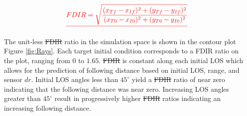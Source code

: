 \documentclass[conference]{IEEEtran}
\providecommand{\DIFadd}[1]{{\protect\color{blue}\uwave{#1}}} %
\providecommand{\DIFdel}[1]{{\protect\color{red}\sout{#1}}}                      %
\providecommand{\DIFaddbegin}{} %
\providecommand{\DIFaddend}{} %
\providecommand{\DIFdelbegin}{} %
\providecommand{\DIFdelend}{} %
\newcommand{\DIFscaledelfig}{0.5}
\newlength{\DIFdelgraphicswidth} %
\newlength{\DIFdelgraphicsheight} %
\newcommand{\DIFaddincludegraphics}[2][]{{\color{blue}\fbox{\DIFOincludegraphics[#1]{#2}}}} %
\newcommand{\DIFdelincludegraphics}[2][]{%
\sbox{\DIFdelgraphicsbox}{\DIFOincludegraphics[#1]{#2}}%
\settoboxwidth{\DIFdelgraphicswidth}{\DIFdelgraphicsbox} %
\settoboxtotalheight{\DIFdelgraphicsheight}{\DIFdelgraphicsbox} %
\scalebox{\DIFscaledelfig}{%
\parbox[b]{\DIFdelgraphicswidth}{\usebox{\DIFdelgraphicsbox}\\[-\baselineskip] \rule{\DIFdelgraphicswidth}{0em}}\llap{\resizebox{\DIFdelgraphicswidth}{\DIFdelgraphicsheight}{%
\setlength{\unitlength}{\DIFdelgraphicswidth}%
\begin{picture}(1,1)%
\thicklines\linethickness{2pt} %
{\color[rgb]{1,0,0}\put(0,0){\framebox(1,1){}}}%
{\color[rgb]{1,0,0}\put(0,0){\line( 1,1){1}}}%
{\color[rgb]{1,0,0}\put(0,1){\line(1,-1){1}}}%
\end{picture}%
}\hspace*{3pt}}} %
} %
\DeclareRobustCommand{\DIFaddbegin}{\DIFOaddbegin \let\includegraphics\DIFaddincludegraphics} %
\DeclareRobustCommand{\DIFaddend}{\DIFOaddend \let\includegraphics\DIFOincludegraphics} %
\DeclareRobustCommand{\DIFdelbegin}{\DIFOdelbegin \let\includegraphics\DIFdelincludegraphics} %
\DeclareRobustCommand{\DIFdelend}{\DIFOaddend \let\includegraphics\DIFOincludegraphics} %
\begin{document}


\begin{displaymath} 
\DIFdel{%
FDIR = \sqrt{\frac{(x_{Tf}-x_{If})^2+(y_{Tf}-y_{If})^2}{(x_{T0}-x_{I0})^2+(y_{T0}-y_{I0})^2}}
}\end{displaymath}

\DIFdelend The unit-less \DIFdelbegin \DIFdel{FDIR }\DIFdelend \DIFaddbegin \DIFadd{$\zeta$ }\DIFaddend ratio in the simulation space is shown in the contour plot Figure \ref{fig:Rays}. Each target initial condition corresponds to a FDIR ratio on the plot, ranging from $0$ to $1.65$. \DIFdelbegin \DIFdel{FDIR }\DIFdelend \DIFaddbegin \DIFadd{$\zeta$ }\DIFaddend is constant along each initial LOS which allows for the prediction of following distance based on initial LOS, range, and sensor $dr$. Initial LOS angles less than $45^{\circ}$ yield a \DIFdelbegin \DIFdel{FDIR }\DIFdelend \DIFaddbegin \DIFadd{$\zeta$ }\DIFaddend ratio of near zero indicating that the following distance was near zero. Increasing LOS angles greater than $45^{\circ}$ result in progressively higher \DIFdelbegin \DIFdel{FDIR }\DIFdelend \DIFaddbegin \DIFadd{$\zeta$ }\DIFaddend ratios indicating an increasing following distance.
\end{document}
